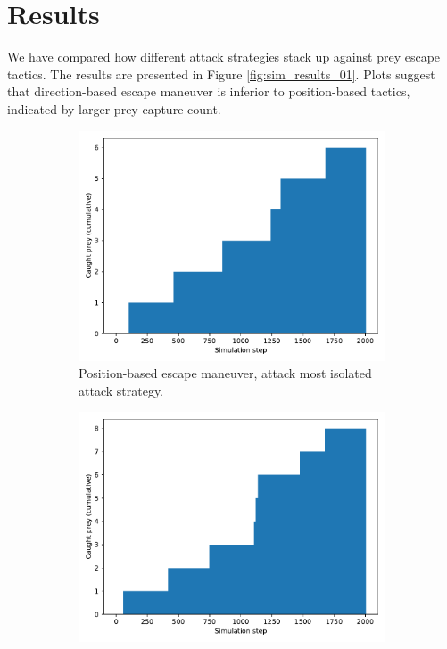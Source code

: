 \documentclass[9pt]{pnas-new}
\begin{document}
\section*{Results}

We have compared how different attack strategies stack up against prey escape tactics. The
results are presented in Figure \ref{fig:sim_results_01}. Plots suggest that
direction-based escape maneuver is inferior to position-based tactics, indicated by larger prey
capture count.
\begin{figure}[h]
    \centering
    \begin{subfigure}[t]{0.4\linewidth}
        \includegraphics[width=\linewidth]{avoid_position_attack_peripheral/predator_success_cumulative_2003.pdf}
        \caption{Position-based escape maneuver, attack most isolated attack strategy.}
    \end{subfigure}%
    \hspace{0.02\linewidth} %
    \begin{subfigure}[t]{0.4\linewidth}
        \includegraphics[width=\linewidth]{avoid_position_attack_nearest/predator_success_cumulative_2003.pdf}

\end{subfigure}
\end{figure}
\end{document}
